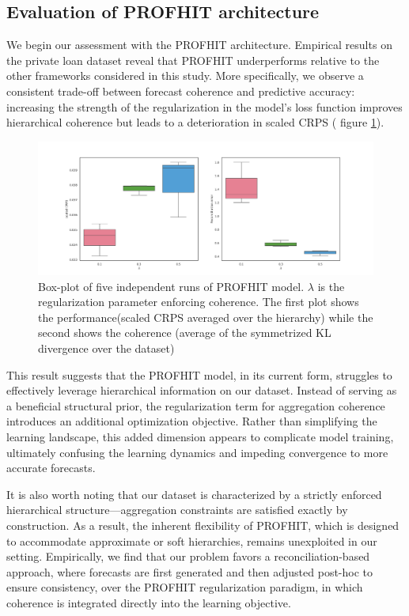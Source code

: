 \documentclass[letterpaper]{article}
\begin{document}
\subsection{Evaluation of PROFHIT architecture}

We begin our assessment with the PROFHIT architecture. 
Empirical results on the private loan dataset reveal that PROFHIT underperforms relative to the other frameworks considered in this study. 
More specifically, we observe a consistent trade-off between forecast coherence and predictive accuracy: increasing the strength of the regularization in the model's loss function improves hierarchical coherence but leads to a deterioration in scaled CRPS ( figure \ref{fig:PROFHIT}).

\begin{figure}
    \centering
    \includegraphics[width=\linewidth]{reconciliation_error.png}
    \caption{Box-plot of five independent runs of PROFHIT model. $\lambda$ is the regularization parameter enforcing coherence. The first plot shows the performance(scaled CRPS averaged over the hierarchy) while the second shows the coherence (average of the symmetrized KL divergence over the dataset)}
    \label{fig:PROFHIT}
\end{figure}

This result suggests that the PROFHIT model, in its current form, struggles to effectively leverage hierarchical information on our dataset. 
Instead of serving as a beneficial structural prior, the regularization term for aggregation coherence introduces an additional optimization objective. 
Rather than simplifying the learning landscape, this added dimension appears to complicate model training, 
ultimately confusing the learning dynamics and impeding convergence to more accurate forecasts.

It is also worth noting that our dataset is characterized by a strictly enforced hierarchical structure—aggregation constraints are satisfied exactly by construction. 
As a result, the inherent flexibility of PROFHIT, which is designed to accommodate approximate or soft hierarchies, remains unexploited in our setting. 
Empirically, we find that our problem favors a reconciliation-based approach, 
where forecasts are first generated and then adjusted post-hoc to ensure consistency, over the PROFHIT regularization paradigm, 
in which coherence is integrated directly into the learning objective.
\end{document}
